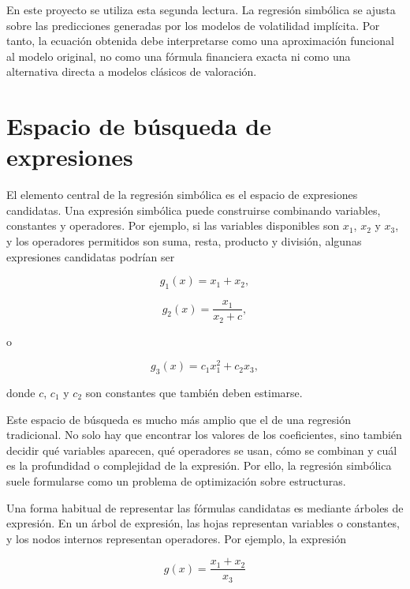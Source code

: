 En este proyecto se utiliza esta segunda lectura. La regresión simbólica se ajusta sobre las predicciones generadas por los modelos de volatilidad implícita. Por tanto, la ecuación obtenida debe interpretarse como una aproximación funcional al modelo original, no como una fórmula financiera exacta ni como una alternativa directa a modelos clásicos de valoración.

\section{Espacio de búsqueda de expresiones}

El elemento central de la regresión simbólica es el espacio de expresiones candidatas. Una expresión simbólica puede construirse combinando variables, constantes y operadores. Por ejemplo, si las variables disponibles son \(x_1\), \(x_2\) y \(x_3\), y los operadores permitidos son suma, resta, producto y división, algunas expresiones candidatas podrían ser

\begin{equation}
g_1(x) = x_1 + x_2,
\label{eq:symbolic-example-1}
\end{equation}

\begin{equation}
g_2(x) = \frac{x_1}{x_2 + c},
\label{eq:symbolic-example-2}
\end{equation}

o

\begin{equation}
g_3(x) = c_1 x_1^2 + c_2 x_3,
\label{eq:symbolic-example-3}
\end{equation}

donde \(c\), \(c_1\) y \(c_2\) son constantes que también deben estimarse.

Este espacio de búsqueda es mucho más amplio que el de una regresión tradicional. No solo hay que encontrar los valores de los coeficientes, sino también decidir qué variables aparecen, qué operadores se usan, cómo se combinan y cuál es la profundidad o complejidad de la expresión. Por ello, la regresión simbólica suele formularse como un problema de optimización sobre estructuras.

Una forma habitual de representar las fórmulas candidatas es mediante árboles de expresión. En un árbol de expresión, las hojas representan variables o constantes, y los nodos internos representan operadores. Por ejemplo, la expresión

\begin{equation}
g(x) = \frac{x_1 + x_2}{x_3}
\label{eq:symbolic-tree-expression}
\end{equation}

